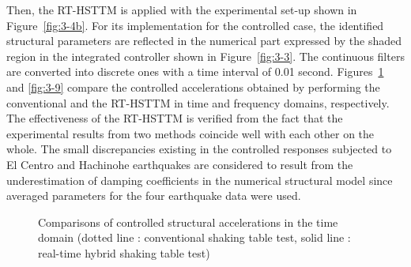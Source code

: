 Then, the RT-HSTTM is applied with the experimental set-up shown in Figure~\ref{fig:3-4b}. For its implementation for the controlled case, the identified structural parameters are reflected in the numerical part expressed by the shaded region in the integrated controller shown in Figure~\ref{fig:3-3}. The continuous filters are converted into discrete ones with a time interval of 0.01 second. Figures~\ref{fig:3-8} and \ref{fig:3-9} compare the controlled accelerations obtained by performing the conventional and the RT-HSTTM in time and frequency domains, respectively. The effectiveness of the RT-HSTTM is verified from the fact that the experimental results from two methods coincide well with each other on the whole. The small discrepancies existing in the controlled responses subjected to El Centro and Hachinohe earthquakes are considered to result from the underestimation of damping coefficients in the numerical structural model since averaged parameters for the four earthquake data were used.

\begin{figure}[!ht]
\centering
\caption{Comparisons of controlled structural accelerations in the time domain
(dotted line : conventional shaking table test, solid line : real-time hybrid shaking table test)
}
\label{fig:3-8}
\end{figure}

